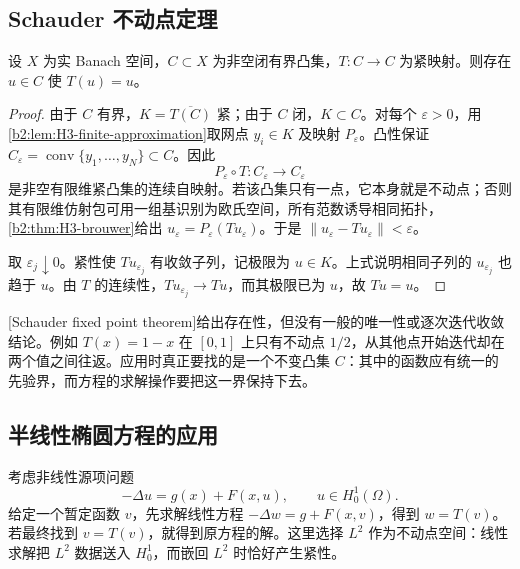 \subsection{Schauder 不动点定理}
\label{b2:subsec:H20303}

\begin{theorem}[Schauder]
\label{b2:thm:H3-schauder}
设 \(X\) 为实 Banach 空间，\(C\subset X\) 为非空闭有界凸集，\(T:C\to C\) 为紧映射。则存在 \(u\in C\) 使 \(T(u)=u\)。
\end{theorem}
\begin{proof}
由于 \(C\) 有界，\(K=\overline{T(C)}\) 紧；由于 \(C\) 闭，\(K\subset C\)。对每个 \(\varepsilon>0\)，用\cref{b2:lem:H3-finite-approximation}取网点 \(y_i\in K\) 及映射 \(P_\varepsilon\)。凸性保证 \(C_\varepsilon=\operatorname{conv}\{y_1,\ldots,y_N\}\subset C\)。因此
\[
 P_\varepsilon\circ T:C_\varepsilon\longrightarrow C_\varepsilon
\]
是非空有限维紧凸集的连续自映射。若该凸集只有一点，它本身就是不动点；否则其有限维仿射包可用一组基识别为欧氏空间，所有范数诱导相同拓扑，\cref{b2:thm:H3-brouwer}给出 \(u_\varepsilon=P_\varepsilon(Tu_\varepsilon)\)。于是 \(\|u_\varepsilon-Tu_\varepsilon\|<\varepsilon\)。

取 \(\varepsilon_j\downarrow0\)。紧性使 \(Tu_{\varepsilon_j}\) 有收敛子列，记极限为 \(u\in K\)。上式说明相同子列的 \(u_{\varepsilon_j}\) 也趋于 \(u\)。由 \(T\) 的连续性，\(Tu_{\varepsilon_j}\to Tu\)，而其极限已为 \(u\)，故 \(Tu=u\)。
\end{proof}

[Schauder fixed point theorem]给出存在性，但没有一般的唯一性或逐次迭代收敛结论。例如 \(T(x)=1-x\) 在 \([0,1]\) 上只有不动点 \(1/2\)，从其他点开始迭代却在两个值之间往返。应用时真正要找的是一个不变凸集 \(C\)：其中的函数应有统一的先验界，而方程的求解操作要把这一界保持下去。

\subsection{半线性椭圆方程的应用}
\label{b2:subsec:H20304}

考虑非线性源项问题
\[
 -\Delta u=g(x)+F(x,u),\qquad u\in H_0^1(\Omega).
\]
给定一个暂定函数 \(v\)，先求解线性方程 \(-\Delta w=g+F(x,v)\)，得到 \(w=T(v)\)。若最终找到 \(v=T(v)\)，就得到原方程的解。这里选择 \(L^2\) 作为不动点空间：线性求解把 \(L^2\) 数据送入 \(H_0^1\)，而嵌回 \(L^2\) 时恰好产生紧性。

